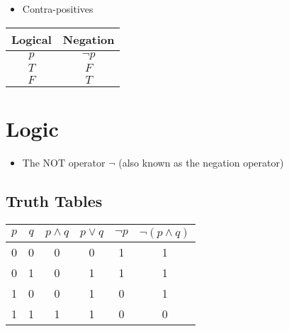 



\begin{itemize}
	\item Contra-positives
\end{itemize}



\begin{center}
	\begin{tabular}{|c|c|}
		Logical & Negation \\ \hline
		$p$	& $\neg p$ \\ \hline
		$T$	& $F$      \\ \hline
		$F$	& $T$      \\ \hline
	\end{tabular}
\end{center}



\section{Logic}
\begin{itemize}
	\item The NOT operator $\neg$ (also known as the negation operator)
\end{itemize}
\subsection{Truth Tables}
{
	\Large
	\begin{center}
		\begin{tabular}{|c|c||c|c||c|c|}
			\hline $p$ & $q$ & $p \wedge q$ & $p\vee q$ & $\neg p$  & $\neg (p \wedge q)$ \\ 
			\hline 0 & 0 & 0 & 0 & 1 & 1 \\ 
			\hline 0 & 1 & 0 & 1 & 1 & 1 \\ 
			\hline 1 & 0 & 0 & 1 & 0 & 1 \\ 
			\hline 1 & 1 & 1 & 1 & 0 & 0 \\ 
			\hline 
		\end{tabular} 
	\end{center}
}

